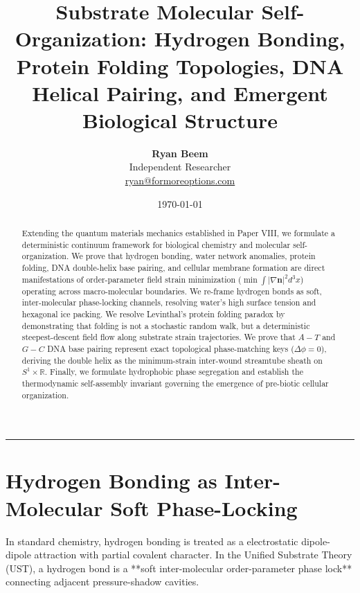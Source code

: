 \documentclass[11pt,a4paper]{article}
\title{\Large\bfseries Substrate Molecular Self-Organization: Hydrogen Bonding, Protein Folding Topologies, DNA Helical Pairing, and Emergent Biological Structure}
\author{
	\textbf{Ryan Beem}\\[0.5em]
	\small Independent Researcher \\
	\small \href{mailto:ryan@formoreoptions.com}{ryan@formoreoptions.com}
}
\date{\today}
\begin{document}
	
	\maketitle
	
	\begin{abstract}
		Extending the quantum materials mechanics established in Paper VIII, we formulate a deterministic continuum framework for biological chemistry and molecular self-organization. We prove that hydrogen bonding, water network anomalies, protein folding, DNA double-helix base pairing, and cellular membrane formation are direct manifestations of order-parameter field strain minimization ($\min \int |\nabla \mathbf{n}|^2 d^3x$) operating across macro-molecular boundaries. We re-frame hydrogen bonds as soft, inter-molecular phase-locking channels, resolving water's high surface tension and hexagonal ice packing. We resolve Levinthal's protein folding paradox by demonstrating that folding is not a stochastic random walk, but a deterministic steepest-descent field flow along substrate strain trajectories. We prove that $A-T$ and $G-C$ DNA base pairing represent exact topological phase-matching keys ($\Delta \phi = 0$), deriving the double helix as the minimum-strain inter-wound streamtube sheath on $S^1 \times \mathbb{R}$. Finally, we formulate hydrophobic phase segregation and establish the thermodynamic self-assembly invariant governing the emergence of pre-biotic cellular organization.
	\end{abstract}
	
	\vspace{1em}
	\hrule
	\vspace{1.5em}
	
	\section{Hydrogen Bonding as Inter-Molecular Soft Phase-Locking}
	\label{sec:hydrogen_bonding_mechanics}
	
	In standard chemistry, hydrogen bonding is treated as a electrostatic dipole-dipole attraction with partial covalent character. In the Unified Substrate Theory (UST), a hydrogen bond is a **soft inter-molecular order-parameter phase lock** connecting adjacent pressure-shadow cavities.
	
\end{document}
